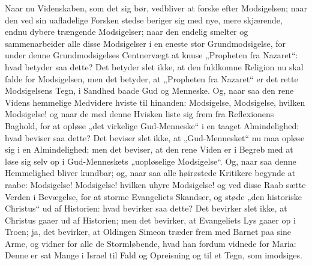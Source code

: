 \documentclass[12pt,a4paper]{book}
\begin{document}
Naar nu Videnskaben, som det sig bør, vedbliver at forske efter Modsigelsen; naar den
ved sin uafladelige Forsken stedse beriger sig med nye, mere skjærende, endnu dybere
trængende Modsigelser; naar den endelig smelter og sammenarbeider alle disse
Modsigelser i en eneste stor Grundmodsigelse, for under denne Grundmodsigelses
Centnervægt at knuse „Propheten fra Nazaret“: hvad betyder saa dette? Det betyder slet
ikke, at den fuldkomne Religion nu skal falde for Modsigelsen, men det betyder, at
„Propheten fra Nazaret“ er det rette Modsigelsens Tegn, i Sandhed baade Gud og
Menneske. Og, naar saa den rene Videns hemmelige Medvidere hviste til hinanden:
Modsigelse, Modsigelse, hvilken Modsigelse! og naar de med denne Hvisken liste sig frem
fra Reflexionens Baghold, for at opløse „det virkelige Gud-Menneske“ i en taaget
Almindelighed: hvad beviser saa dette? Det beviser slet ikke, at „Gud-Mennesket“ nu maa
opløse sig i en Almindelighed; men det beviser, at den rene Viden er i Begreb med at
løse sig selv op i Gud-Menneskets „uopløselige Modsigelse“. Og, naar saa denne
Hemmelighed bliver kundbar; og, naar saa alle høirøstede Kritikere begynde at raabe:
Modsigelse! Modsigelse! hvilken uhyre Modsigelse! og ved disse Raab sætte Verden i
Bevægelse, for at storme Evangeliets Skandser, og støde „den historiske Christus“ ud af
Historien: hvad bevirker saa dette? Det bevirker slet ikke, at Christus gaaer ud af
Historien; men det bevirker, at Evangeliets Lys gaaer op i Troen; ja, det bevirker, at
Oldingen Simeon træder frem med Barnet paa sine Arme, og vidner for alle de
Stormløbende, hvad han fordum vidnede for Maria: {\large Denne er sat Mange i Israel
til Fald og Opreisning og til et Tegn, som imodsiges.}
\end{document}

